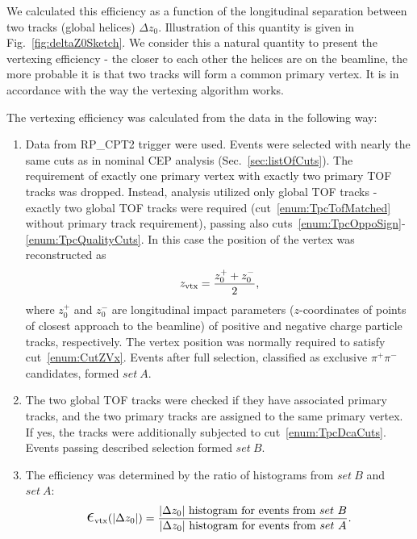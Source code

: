 We calculated this efficiency as a function of the longitudinal separation between two tracks (global helices) $\Delta z_{0}$. Illustration of this quantity is given in Fig.~\ref{fig:deltaZ0Sketch}. We consider this a natural quantity to present the vertexing efficiency - the closer to each other the helices are on the beamline, the more probable it is that two tracks will form a common primary vertex. It is in accordance with the way the vertexing algorithm works.


The vertexing efficiency was calculated from the data in the following way:
\begin{enumerate}
\item Data from RP\_CPT2 trigger were used. Events were selected with nearly the same cuts as in nominal CEP analysis (Sec.~\ref{sec:listOfCuts}). The requirement of exactly one primary vertex with exactly two primary TOF tracks was dropped. Instead, analysis utilized only global TOF tracks - exactly two global TOF tracks were required (cut~\ref{enum:TpcTofMatched} without primary track requirement), passing also cuts~\ref{enum:TpcOppoSign}-\ref{enum:TpcQualityCuts}. In this case the position of the vertex was reconstructed as\vspace*{-10pt}
\begin{equation}
 z_{\text{vtx}} = \frac{z_{0}^{+}+z_{0}^{-}}{2},\vspace*{-5pt}
\end{equation}
where $z_{0}^{+}$ and $z_{0}^{-}$ are longitudinal impact parameters ($z$-coordinates of points of closest approach to the beamline) of positive and negative charge particle tracks, respectively. The vertex position was normally required to satisfy cut~\ref{enum:CutZVx}. Events after full selection, classified as exclusive $\pi^{+}\pi^{-}$ candidates, formed $set~A$.

\item The two global TOF tracks were checked if they have associated primary tracks, and the two primary tracks are assigned to the same primary vertex. If yes, the tracks were additionally subjected to cut~\ref{enum:TpcDcaCuts}. Events passing described selection formed $set~B$.

	\item The efficiency was determined by the ratio of histograms from $set~B$ and $set~A$:
	\begin{equation}\label{eq:vertexingEffDef}
 \mbox{\LARGE$\epsilon$}_{\text{vtx}}(|\Delta z_{0}|) = \frac{|\Delta z_{0}|~\text{histogram for events from}~set~B}{|\Delta z_{0}|~\text{histogram for events from}~set~A}.
  \end{equation}
\end{enumerate}

